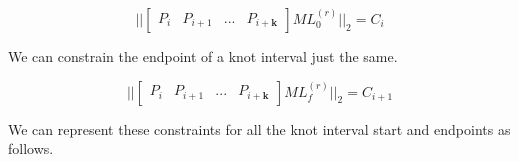 \documentclass{article}
\begin{document}
\begin{equation}
   || \begin{bmatrix} P_{i} & P_{i+1} & ... & P_{i+\textbf{k}}\end{bmatrix} M L_0^{(r)} ||_2 = C_i
\end{equation}

We can constrain the endpoint of a knot interval just the same.

\begin{equation}
   || \begin{bmatrix} P_{i} & P_{i+1} & ... & P_{i+\textbf{k}}\end{bmatrix} M L_f^{(r)} ||_2 = C_{i+1}
\end{equation}

We can represent these constraints for all the knot interval start and endpoints as follows.
\end{document}
